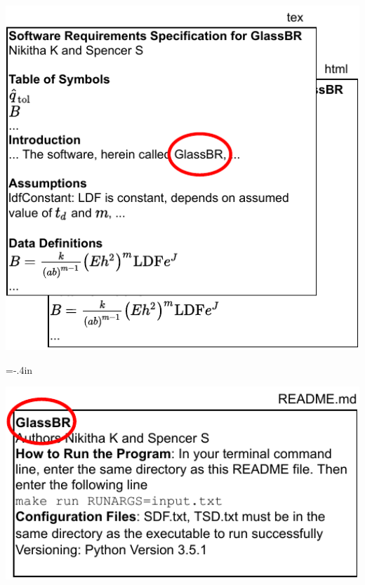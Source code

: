 \documentclass[usenames,dvipsnames]{beamer}
\begin{document}
\begin{frame}[plain]
  
  
  \includegraphics[width=1.05\textwidth]{SRSCircleGlassBR.pdf}
  
\end{frame}
\hoffset=0in %
\hoffset=-.4in %
\begin{frame}[plain]
  
  
  \includegraphics[width=1.05\textwidth]{READMECircleGlassBR.pdf}
  
\end{frame}
\end{document}
